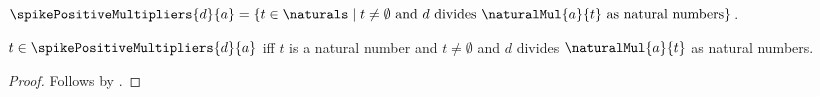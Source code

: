 \begin{definition}\label{spike15_positive_multiplier_set}
    $\spikePositiveMultipliers{d}{a}=
        \{t\in\naturals\mid
            \text{$t\neq\emptyset$ and
                $d$ divides $\naturalMul{a}{t}$ as natural numbers}\}$.
\end{definition}

\begin{proposition}\label{spike15_positive_multiplier_iff}
    $t\in\spikePositiveMultipliers{d}{a}$ iff
        $t$ is a natural number and $t\neq\emptyset$ and
        $d$ divides $\naturalMul{a}{t}$ as natural numbers.
\end{proposition}
\begin{proof}
    Follows by .
\end{proof}

